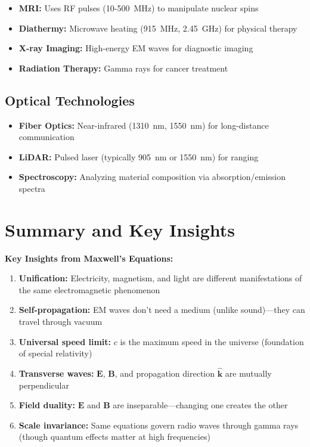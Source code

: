 \begin{itemize}
\item \textbf{MRI:} Uses RF pulses (10-500~MHz) to manipulate nuclear spins
\item \textbf{Diathermy:} Microwave heating (915~MHz, 2.45~GHz) for physical therapy
\item \textbf{X-ray Imaging:} High-energy EM waves for diagnostic imaging
\item \textbf{Radiation Therapy:} Gamma rays for cancer treatment
\end{itemize}

\subsection{Optical Technologies}

\begin{itemize}
\item \textbf{Fiber Optics:} Near-infrared (1310~nm, 1550~nm) for long-distance communication
\item \textbf{LiDAR:} Pulsed laser (typically 905~nm or 1550~nm) for ranging
\item \textbf{Spectroscopy:} Analyzing material composition via absorption/emission spectra
\end{itemize}

\section{Summary and Key Insights}

\begin{keyconcept}
\textbf{Key Insights from Maxwell's Equations:}
\begin{enumerate}
\item \textbf{Unification:} Electricity, magnetism, and light are different manifestations of the same electromagnetic phenomenon
\item \textbf{Self-propagation:} EM waves don't need a medium (unlike sound)---they can travel through vacuum
\item \textbf{Universal speed limit:} $c$ is the maximum speed in the universe (foundation of special relativity)
\item \textbf{Transverse waves:} $\mathbf{E}$, $\mathbf{B}$, and propagation direction $\hat{\mathbf{k}}$ are mutually perpendicular
\item \textbf{Field duality:} $\mathbf{E}$ and $\mathbf{B}$ are inseparable---changing one creates the other
\item \textbf{Scale invariance:} Same equations govern radio waves through gamma rays (though quantum effects matter at high frequencies)
\end{enumerate}
\end{keyconcept}

